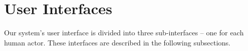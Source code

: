 \section{User Interfaces}
\label{sec:interfaces}
Our system's user interface is divided into three sub-interfaces -- one for each human actor.
These interfaces are described in the following subsections.



